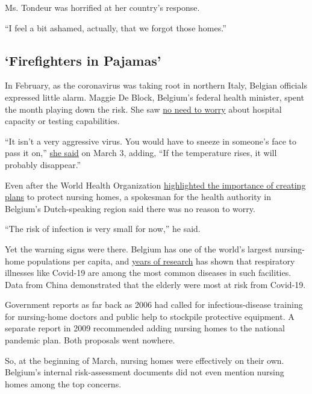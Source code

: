 Ms. Tondeur was horrified at her country's response.

``I feel a bit ashamed, actually, that we forgot those homes.''

\hypertarget{firefighters-in-pajamas}{%
\subsection{`Firefighters in Pajamas'}\label{firefighters-in-pajamas}}

In February, as the coronavirus was taking root in northern Italy,
Belgian officials expressed little alarm. Maggie De Block, Belgium's
federal health minister, spent the month playing down the risk. She saw
\href{https://plus.lesoir.be/282733/article/2020-02-25/maggie-de-block-sur-le-coronavirus-au-soir-il-faut-eviter-les-reflexes-de}{no
need to worry} about hospital capacity or testing capabilities.

``It isn't a very aggressive virus. You would have to sneeze in
someone's face to pass it on,''
\href{https://www.maggiedeblock.be/coronavirus-er-is-veel-paniekzaaierij-de-tijd-03-03-2020/}{she
said} on March 3, adding, ``If the temperature rises, it will probably
disappear.''

Even after the World Health Organization
\href{https://www.who.int/docs/default-source/coronaviruse/who-china-joint-mission-on-covid-19-final-report.pdf}{highlighted
the importance of creating plans} to protect nursing homes, a spokesman
for the health authority in Belgium's Dutch-speaking region said there
was no reason to worry.

``The risk of infection is very small for now,'' he said.

Yet the warning signs were there. Belgium has one of the world's largest
nursing-home populations per capita, and
\href{http://www.nsih.be/download/LTCF/Rapport/HALT-3_Nat\%20Rapport_FR_V3.pdf}{years
of research} has shown that respiratory illnesses like Covid-19 are
among the most common diseases in such facilities. Data from China
demonstrated that the elderly were most at risk from Covid-19.

Government reports as far back as 2006 had called for infectious-disease
training for nursing-home doctors and public help to stockpile
protective equipment. A separate report in 2009 recommended adding
nursing homes to the national pandemic plan. Both proposals went
nowhere.

So, at the beginning of March, nursing homes were effectively on their
own. Belgium's internal risk-assessment documents did not even mention
nursing homes among the top concerns.

